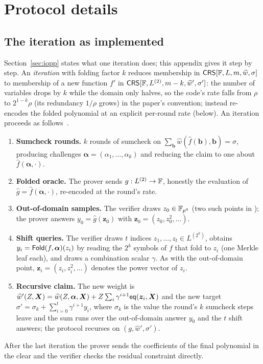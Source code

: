 \section{Protocol details}
\label{sec:app-protocols}

\subsection{The \WHIR{} iteration as implemented}
\label{sec:app-whir}

Section~\ref{sec:iopp} states what one iteration does; this appendix gives it step by step. An \emph{iteration} with folding factor $k$ reduces membership in $\mathsf{CRS}[\mathbb{F}, L, m, \widehat w, \sigma]$ to membership of a new function $f'$ in $\mathsf{CRS}[\mathbb{F}, L^{(2)}, m - k, \widehat w', \sigma']$: the number of variables drops by $k$ while the domain only halves, so the code's rate falls from $\rho$ to $2^{1-k}\rho$ (its redundancy $1/\rho$ grows) in the paper's convention; \Zirenver{} instead re-encodes the folded polynomial at an explicit per-round rate (below). An iteration proceeds as follows~\citep[\S2.1.3]{whir}.
\begin{enumerate}
  \item \textbf{Sumcheck rounds.} $k$ rounds of sumcheck on $\sum_{\bm b} \widehat w(\widehat f(\bm b), \bm b) = \sigma$, producing challenges $\bm\alpha = (\alpha_1, \dots, \alpha_k)$ and reducing the claim to one about $\widehat f(\bm\alpha, \cdot)$.
  \item \textbf{Folded oracle.} The prover sends $g : L^{(2)} \to \mathbb{F}$, honestly the evaluation of $\widehat g = \widehat f(\bm\alpha, \cdot)$, re-encoded at the round's rate.
  \item \textbf{Out-of-domain samples.} The verifier draws $z_0 \in \mathbb{F}_{p^4}$ (two such points in \Zirenver{}); the prover answers $y_0 = \widehat g(\bm z_0)$ with $\bm z_0 = (z_0, z_0^2, \dots)$.
  \item \textbf{Shift queries.} The verifier draws $t$ indices $z_1, \dots, z_t \in L^{(2^k)}$, obtains $y_i = \mathsf{Fold}(f, \bm\alpha)(z_i)$ by reading the $2^k$ symbols of $f$ that fold to $z_i$ (one Merkle leaf each), and draws a combination scalar $\gamma$. As with the out-of-domain point, $\bm z_i = (z_i, z_i^2, \dots)$ denotes the power vector of $z_i$.
  \item \textbf{Recursive claim.} The new weight is $\widehat w'(Z, \bm X) = \widehat w(Z, \bm\alpha, \bm X) + Z \sum_i \gamma^{i+1} \mathsf{eq}(\bm z_i, \bm X)$ and the new target $\sigma' = \sigma_k + \sum_{i=0}^{t} \gamma^{i+1} y_i$, where $\sigma_k$ is the value the round's $k$ sumcheck steps leave and the sum runs over the out-of-domain answer $y_0$ and the $t$ shift answers; the protocol recurses on $(g, \widehat w', \sigma')$.
\end{enumerate}
After the last iteration the prover sends the coefficients of the final polynomial in the clear and the verifier checks the residual constraint directly.

